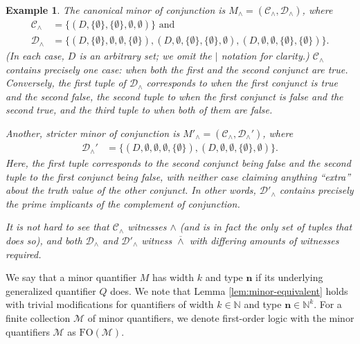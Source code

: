\documentclass{article}
\newtheorem{example}[theorem]{Example}
\theoremstyle{definition}
\begin{document}
\begin{example}
    The canonical minor of conjunction is $M_\land=(\mathcal{C}_\land,\mathcal{D}_\land)$, where
    \begin{align*}
        \mathcal{C}_\land&=\{(D,\{\emptyset\},\{\emptyset\}, \emptyset, \emptyset)\} \text{ and}\\
        \mathcal{D}_\land&=\{(D,\{\emptyset\},\emptyset,\emptyset,\{\emptyset\}),(D,\emptyset,\{\emptyset\},\{\emptyset\},\emptyset),(D,\emptyset,\emptyset,\{\emptyset\},\{\emptyset\})\}.
    \end{align*}
    (In each case, $D$ is an arbitrary set; we omit the $\mid$ notation for clarity.) $\mathcal{C}_\land$ contains precisely one case: when both the first and the second conjunct are true. Conversely, the first tuple of $\mathcal{D}_\land$ corresponds to when the first conjunct is true and the second false, the second tuple to when the first conjunct is false and the second true, and the third tuple to when both of them are false.

    Another, stricter minor of conjunction is $M'_\land=(\mathcal{C}_\land,\mathcal{D}_\land')$, where
    \begin{align*}
        \mathcal{D}_\land'&=\{(D,\emptyset,\emptyset,\emptyset,\{\emptyset\}),(D,\emptyset,\emptyset,\{\emptyset\},\emptyset)\}.
    \end{align*}
    Here, the first tuple corresponds to the second conjunct being false and the second tuple to the first conjunct being false, with neither case claiming anything ``extra'' about the truth value of the other conjunct. In other words, $\mathcal{D}'_\land$ contains precisely the prime implicants of the complement of conjunction.

    It is not hard to see that $\mathcal{C}_\land$ witnesses $\land$ (and is in fact the only set of tuples that does so), and both $\mathcal{D}_\land$ and $\mathcal{D}'_\land$ witness $\overline{\land}$ with differing amounts of witnesses required.
\end{example}

We say that a minor quantifier $M$ has width $k$ and type $\textbf{n}$ if its underlying generalized quantifier $Q$ does. We note that Lemma \ref{lem:minor-equivalent} holds with trivial modifications for quantifiers of width $k\in\mathbb{N}$ and type $\textbf{n}\in \mathbb{N}^k$. For a finite collection $\mathcal{M}$ of minor quantifiers, we denote first-order logic with the minor quantifiers $\mathcal{M}$ as $\mathrm{FO}(\mathcal{M})$.
\end{document}
